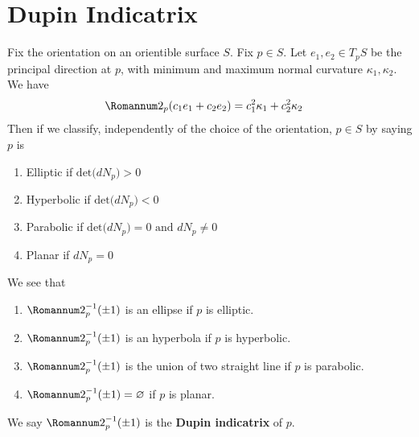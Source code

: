 \documentclass{report}
\begin{document}
\section{Dupin Indicatrix}
\begin{mdframed}

Fix the orientation on an orientible surface $S$. Fix $p \in S$. Let $e_1,e_2\in T_pS$ be the principal direction at  $p$, with minimum and maximum normal curvature $\kappa_1,\kappa_2$. We have 
\begin{align*}
\Sec_p (c_1e_1+c_2e_2)&= c_1^2 \kappa_1 + c_2^2 \kappa_2
\end{align*}
Then if we classify, independently of the choice of the orientation, $p\in  S$ by saying $p$ is 
\begin{enumerate}[label=(\alph*)]
  \item Elliptic if $\text{det}\Big(dN_p \Big)>0$ 
  \item Hyperbolic if $\text{det}\Big(dN_p \Big)<0$ 
  \item Parabolic if $\text{det}\Big(dN_p \Big)=0\text{ and }dN_p\neq 0$ 
  \item Planar if $dN_p=0$
\end{enumerate}
We see that 
\begin{enumerate}[label=(\alph*)]
  \item $\Sec_p^{-1}(\pm 1)$ is an ellipse if $p$ is elliptic. 
  \item $\Sec_p^{-1}(\pm 1)$ is an hyperbola if $p$ is hyperbolic.
  \item $\Sec_p^{-1}(\pm 1)$ is the union of two straight line if $p$ is parabolic.
  \item $\Sec_p^{-1}(\pm 1)=\varnothing$ if $p$ is planar. 
\end{enumerate}
We say $\Sec_p^{-1}(\pm 1)$ is the \textbf{Dupin indicatrix} of $p$.
\end{mdframed}
\end{document}
